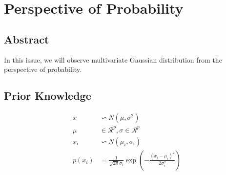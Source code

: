 \documentclass{report}
\begin{document}
\section{Perspective of Probability}
\subsection{Abstract}
In this issue, we will observe multivariate Gaussian distribution from the perspective of probability.
\subsection{Prior Knowledge}
$$
\begin{aligned}
x &\backsim N(\mu, \sigma^2)\\
\mu &\in \mathcal{R}^p, \sigma \in \mathcal{R}^p\\
x_i &\backsim N(\mu_i, \sigma_i)\\
p(x_i) &= \frac{1}{\sqrt{2\pi}\sigma_i} \exp(-\frac{(x_i - \mu_i)^2}{2\sigma_i^2})
\end{aligned}
$$
\end{document}
